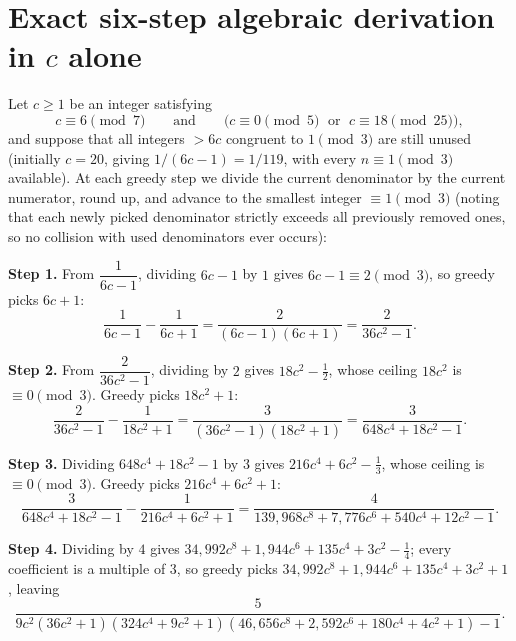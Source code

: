 \documentclass[11pt,a4paper]{amsart}
\theoremstyle{remark}
\begin{document}
\section{\texorpdfstring{Exact six-step algebraic derivation in $c$ alone}{Exact six-step algebraic derivation in c alone}}

Let $c \ge 1$ be an integer satisfying
\begin{equation}\label{eq:inv}
c \equiv 6 \pmod{7} \qquad\text{and}\qquad \bigl(c \equiv 0 \pmod{5} \;\text{ or }\; c \equiv 18 \pmod{25}\bigr),
\end{equation}
and suppose that all integers $> 6 c$ congruent to $1 \pmod{3}$ are still unused (initially $c = 20$, giving $1 / (6 c - 1) = 1 / 119$, with every $n \equiv 1 \pmod{3}$ available). At each greedy step we divide the current denominator by the current numerator, round up, and advance to the smallest integer $\equiv 1 \pmod{3}$ (noting that each newly picked denominator strictly exceeds all previously removed ones, so no collision with used denominators ever occurs):

\medskip
\noindent\textbf{Step 1.} From $\dfrac{1}{6c - 1}$, dividing $6c - 1$ by $1$ gives $6c - 1 \equiv 2 \pmod{3}$, so greedy picks $6c + 1$:
\[
\frac{1}{6c - 1} - \frac{1}{6c + 1} = \frac{2}{(6c - 1)(6c + 1)} = \frac{2}{36c^2 - 1}.
\]

\noindent\textbf{Step 2.} From $\dfrac{2}{36c^2 - 1}$, dividing by $2$ gives $18c^2 - \tfrac{1}{2}$, whose ceiling $18c^2$ is $\equiv 0 \pmod{3}$. Greedy picks $18c^2 + 1$:
\[
\frac{2}{36c^2 - 1} - \frac{1}{18c^2 + 1} = \frac{3}{(36c^2 - 1)(18c^2 + 1)} = \frac{3}{648c^4 + 18c^2 - 1}.
\]

\noindent\textbf{Step 3.} Dividing $648c^4 + 18c^2 - 1$ by $3$ gives $216c^4 + 6c^2 - \tfrac{1}{3}$, whose ceiling is $\equiv 0 \pmod{3}$. Greedy picks $216c^4 + 6c^2 + 1$:
\[
\frac{3}{648c^4 + 18c^2 - 1} - \frac{1}{216c^4 + 6c^2 + 1} = \frac{4}{139{,}968c^8 + 7{,}776c^6 + 540c^4 + 12c^2 - 1}.
\]

\noindent\textbf{Step 4.} Dividing by $4$ gives $34{,}992c^8 + 1{,}944c^6 + 135c^4 + 3c^2 - \tfrac{1}{4}$; every coefficient is a multiple of $3$, so greedy picks $34{,}992c^8 + 1{,}944c^6 + 135c^4 + 3c^2 + 1$, leaving
\[
\frac{5}{9c^2(36c^2 + 1)(324c^4 + 9c^2 + 1)(46{,}656c^8 + 2{,}592c^6 + 180c^4 + 4c^2 + 1) - 1}.
\]
\end{document}
